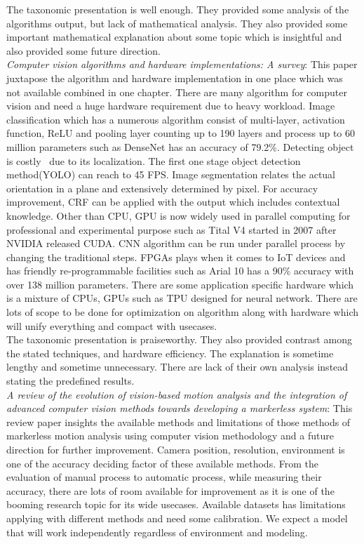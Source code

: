 The taxonomic presentation is well enough. They provided some analysis of the algorithms output, but lack of mathematical analysis. They also provided some important mathematical explanation about some topic which is insightful and also provided some future direction.\\

\textit{Computer vision algorithms and hardware implementations: A survey}\cite{feng_computer_2019}: This paper juxtapose the algorithm and hardware implementation in one place which was not available combined in one chapter. There are many algorithm for computer vision and need a huge hardware requirement due to heavy workload. Image classification which has a numerous algorithm consist of multi-layer, activation function, ReLU and pooling layer counting up to 190 layers and process up to 60 million parameters such as DenseNet has an accuracy of 79.2\%. Detecting object is costly  due to its localization. The first one stage object detection method(YOLO) can reach to 45 FPS. Image segmentation relates the actual orientation in a plane and extensively determined by pixel. For accuracy improvement, CRF can be applied with the output which includes contextual knowledge. Other than CPU, GPU is now widely used in parallel computing for professional and experimental purpose such as Tital V4 started in 2007 after NVIDIA released CUDA. CNN algorithm can be run under parallel process by changing the traditional steps. FPGAs plays when it comes to IoT devices and has friendly re-programmable facilities such as Arial 10 has a 90\% accuracy with over 138 million parameters. There are some application specific hardware which is a mixture of CPUs, GPUs such as TPU designed for neural network. There are lots of scope to be done for optimization on algorithm along with hardware which will unify everything and compact with usecases.\\

The taxonomic presentation is praiseworthy. They also provided contrast among the stated techniques, and hardware efficiency. The explanation is sometime lengthy and sometime unnecessary. There are lack of their own analysis instead stating the predefined results.\\

\textit{A review of the evolution of vision-based motion analysis and the integration of advanced computer vision methods towards developing a markerless system}\cite{colyer_review_2018}: This review paper insights the available methods and limitations of those methods of markerless motion analysis using computer vision methodology and a future direction for further improvement. Camera position, resolution, environment is one of the accuracy deciding factor of these available methods. From the evaluation of manual process to automatic process, while measuring their accuracy, there are lots of room available for improvement as it is one of the booming research topic for its wide usecases. Available datasets has limitations applying with different methods and need some calibration. We expect a model that will work independently regardless of environment and modeling.\\


